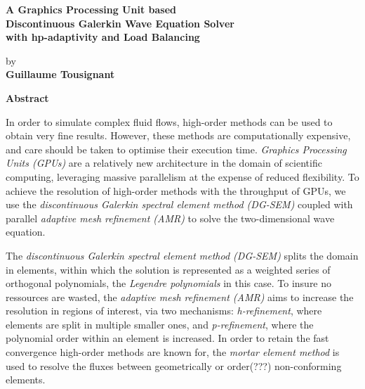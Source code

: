 \thispagestyle{plain} %

\begin{center}
	\vspace*{0.5cm} %
	{ \Large
		\textbf{A Graphics Processing Unit based \\ 
			Discontinuous Galerkin Wave Equation Solver \\
			with hp-adaptivity and Load Balancing \\
		}
	}
	\vspace{0.4cm}
	\large

	by \\
	\vspace{0.4cm}
	\textbf{Guillaume Tousignant}
	
	\vspace{0.9cm}
	\textbf{Abstract}
	
\end{center}

In order to simulate complex fluid flows, high-order methods can be used to obtain very fine results. However,
these methods are computationally expensive, and care should be taken to optimise their execution time. 
\textit{Graphics Processing Units (GPUs)} are a relatively new architecture in the domain of scientific 
computing, leveraging massive parallelism at the expense of reduced flexibility. To achieve the resolution of
high-order methods with the throughput of GPUs, we use the \textit{discontinuous Galerkin spectral element 
method (DG-SEM)} coupled with parallel \textit{adaptive mesh refinement (AMR)} to solve the two-dimensional 
wave equation. 

The \textit{discontinuous Galerkin spectral element method (DG-SEM)} splits the domain in 
elements, within which the solution is represented as a weighted series of orthogonal polynomials, the 
\textit{Legendre polynomials} in this case. To insure no ressources are wasted, the \textit{adaptive mesh 
refinement (AMR)} aims to increase the resolution in regions of interest, via two mechanisms: 
\textit{h-refinement}, where elements are split in multiple smaller ones, and \textit{p-refinement}, where
the polynomial order within an element is increased. In order to retain the fast convergence high-order 
methods are known for, the \textit{mortar element method} is used to resolve the fluxes between geometrically
or order(???) non-conforming elements.

